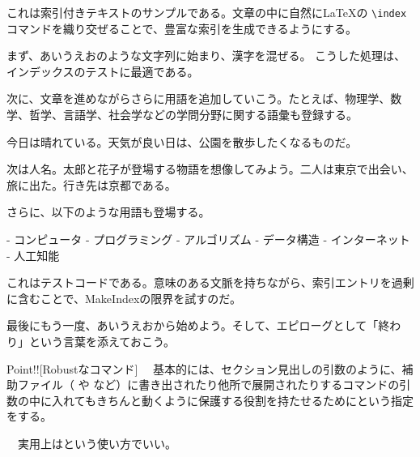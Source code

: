 \documentclass[luatex,fontsize=8pt,paper=b5,twoside,report]{jlreq}%
\begin{document}
\begin{multicols*}{2}
これは索引付きテキストのサンプルである。文章の中に自然に\LaTeX の \verb|\index| コマンドを織り交ぜることで、豊富な索引を生成できるようにする。

まず、あいうえおのような文字列に始まり、漢字を混ぜる。  
こうした処理は、インデックスのテストに最適である。

次に、文章を進めながらさらに用語を追加していこう。たとえば、物理学、数学、哲学、言語学、社会学などの学問分野に関する語彙も登録する。

今日は晴れている。天気が良い日は、公園を散歩したくなるものだ。

次は人名。太郎と花子が登場する物語を想像してみよう。二人は東京で出会い、旅に出た。行き先は京都である。

さらに、以下のような用語も登場する。

- コンピュータ
- プログラミング
- アルゴリズム
- データ構造
- インターネット
- 人工知能

これはテストコードである。意味のある文脈を持ちながら、索引エントリを過剰に含むことで、MakeIndexの限界を試すのだ。

最後にもう一度、あいうえおから始めよう。そして、エピローグとして「終わり」という言葉を添えておこう。
\begin{ptbs}{\mbox{Point!!}}[Robustなコマンド]
  　基本的には、セクション見出しの引数のように、補助ファイル（ や  など）に書き出されたり他所で展開されたりするコマンドの引数の中に入れてもきちんと動くように保護する役割を持たせるためにという指定をする。

  　実用上はという使い方でいい。
\end{ptbs}
\end{multicols*}


\end{document}
